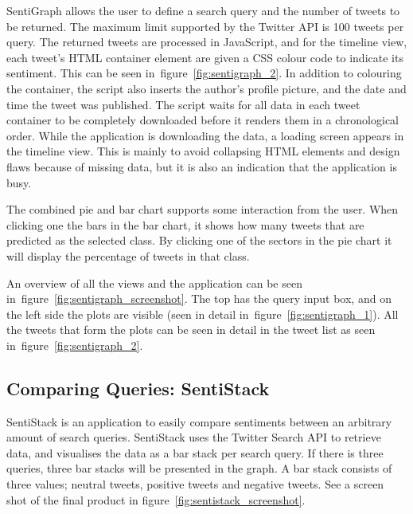 SentiGraph allows the user to define a search query and the number of tweets to be returned. The maximum limit supported by the Twitter API is 100 tweets per query. The returned tweets are processed in JavaScript, and for the timeline view, each tweet's HTML container element are given a CSS colour code to indicate its sentiment. This can be seen in~figure~\ref{fig:sentigraph_2}. In addition to colouring the container, the script also inserts the author's profile picture, and the date and time the tweet was published. The script waits for all data in each tweet container to be completely downloaded before it renders them in a chronological order. While the application is downloading the data, a loading screen appears in the timeline view. This is mainly to avoid collapsing HTML elements and design flaws because of missing data, but it is also an indication that the application is busy.

The combined pie and bar chart supports some interaction from the user. When clicking one the bars in the bar chart, it shows how many tweets that are predicted as the selected class. By clicking one of the sectors in the pie chart it will display the percentage of tweets in that class.

An overview of all the views and the application can be seen in~figure~\ref{fig:sentigraph_screenshot}. The top has the query input box, and on the left side the plots are visible (seen in detail in~figure~\ref{fig:sentigraph_1}). All the tweets that form the plots can be seen in detail in the tweet list as seen in~figure~\ref{fig:sentigraph_2}.

\subsection{Comparing Queries: SentiStack}

SentiStack is an application to easily compare sentiments between an arbitrary amount of search queries. SentiStack uses the Twitter Search API to retrieve data, and visualises the data as a bar stack per search query. If there is three queries, three bar stacks will be presented in the graph. A bar stack consists of three values; neutral tweets, positive tweets and negative tweets. See a screen shot of the final product in figure~\ref{fig:sentistack_screenshot}.


